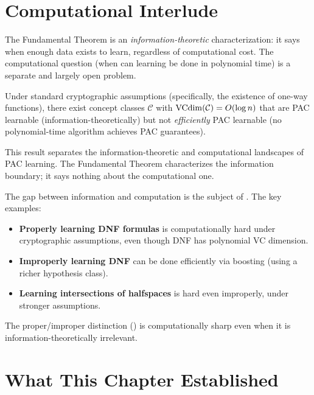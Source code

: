 \section{Computational Interlude}
\label{sec:computational}

The Fundamental Theorem is an \emph{information-theoretic} characterization:
it says when enough data exists to learn, regardless of computational cost.
The computational question (when can learning be done in polynomial
time) is a separate and largely open problem.

\begin{thm}
\label{thm:kearns-valiant-pac}
Under standard cryptographic assumptions (specifically, the existence of
one-way functions), there exist concept classes $\mathcal{C}$ with
$\mathrm{VCdim}(\mathcal{C}) = O(\log n)$ that are PAC learnable
(information-theoretically) but not \emph{efficiently} PAC learnable (no
polynomial-time algorithm achieves PAC guarantees).
\end{thm}

This result separates the information-theoretic and computational landscapes of
PAC learning.  The Fundamental Theorem characterizes the information boundary;
it says nothing about the computational one.

\begin{computational}
The gap between information and computation is the subject of
.  The key examples:
\begin{itemize}[nosep]
\item \textbf{Properly learning DNF formulas} is computationally hard under
  cryptographic assumptions, even though DNF has polynomial VC dimension.
\item \textbf{Improperly learning DNF} can be done efficiently via boosting
  (using a richer hypothesis class).
\item \textbf{Learning intersections of halfspaces} is hard even improperly,
  under stronger assumptions.
\end{itemize}
The proper/improper distinction () is
computationally sharp even when it is information-theoretically irrelevant.
\end{computational}



\section{What This Chapter Established}
\label{sec:ch5-summary}

